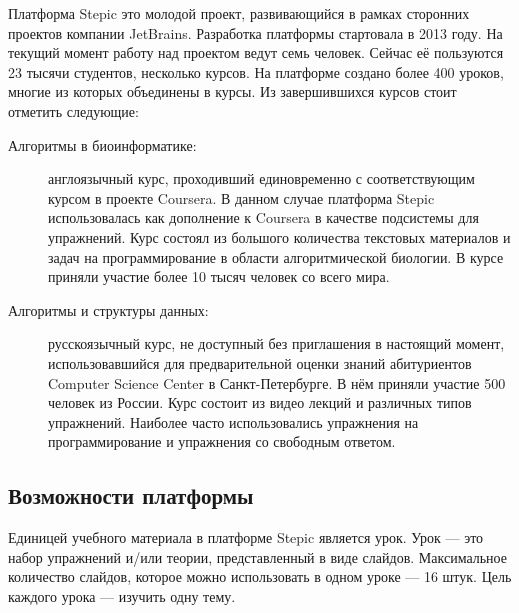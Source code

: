 \documentclass{matmex-diploma-custom}
\begin{document}
Платформа Stepic \cite{stepic} это молодой проект, развивающийся в
рамках сторонних проектов компании JetBrains. Разработка платформы
стартовала в 2013 году. На текущий момент работу над проектом ведут
семь человек. Сейчас её пользуются 23 тысячи студентов, несколько
курсов. На платформе создано более 400 уроков, многие из которых
объединены в курсы. Из завершившихся курсов стоит отметить следующие:

\begin{description}
\item[Алгоритмы в биоинформатике:] англоязычный курс, проходивший
  единовременно с соответствующим курсом в проекте Coursera. В данном
  случае платформа Stepic использовалась как дополнение к Coursera в
  качестве подсистемы для упражнений. Курс состоял из большого
  количества текстовых материалов и задач на программирование в
  области алгоритмической биологии. В курсе приняли участие более 10
  тысяч человек со всего мира.

\item[Алгоритмы и структуры данных:] русскоязычный курс, не доступный
  без приглашения в настоящий момент, использовавшийся для
  предварительной оценки знаний абитуриентов Computer Science Center в
  Санкт-Петербурге. В нём приняли участие 500 человек из России. Курс
  состоит из видео лекций и различных типов упражнений. Наиболее часто
  использовались упражнения на программирование и упражнения со
  свободным ответом.
\end{description}

\subsection{Возможности платформы}
Единицей учебного материала в платформе Stepic является урок. Урок ---
это набор упражнений и/или теории, представленный в виде
слайдов. Максимальное количество слайдов, которое можно использовать в
одном уроке --- 16 штук. Цель каждого урока --- изучить одну тему.
\end{document}

